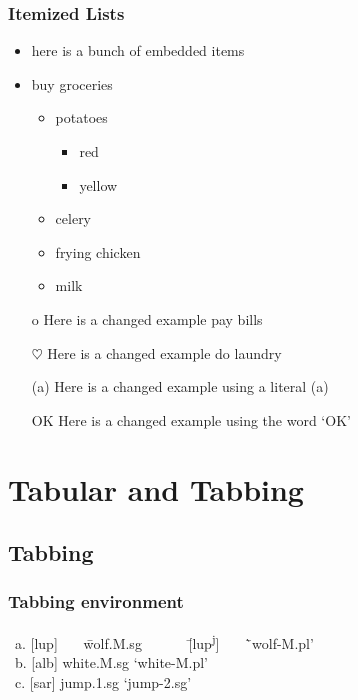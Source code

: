 \documentclass[noamsthm]{beamer}
\begin{document}
\begin{frame}
\frametitle{Itemized Lists}


\begin{itemize}
	\item here is a bunch of embedded items
	\item buy groceries
	\begin{itemize}
		\item potatoes
		\begin{itemize}
			\item red
			\item yellow
		\end{itemize}
		\item celery
		\item frying chicken
		\item milk
	\end{itemize}
	\item[o] Here is a changed example pay bills
	\item [$\heartsuit$] Here is a changed example do laundry
	\item [(a)] Here is a changed example using a literal (a)
	\item [OK] Here is a changed example using the word `OK'

\end{itemize}

\end{frame}

\section{Tabular and Tabbing}

\subsection{Tabbing}

\begin{frame}
\frametitle{Tabbing environment}

\begin{example}
\begin{tabbing}
~a. 	[lup] ~~~\=	wolf.M.sg  ~~~~~~\= [lup\textsuperscript{j}]  ~~~\= 	`wolf-M.pl'\\%
~b. 	[alb] 	\> white.M.sg  \> `white-M.pl' \\%
~c. 	[sar]	\> jump.1.sg 	 \> `jump-2.sg'\\ %
\end{tabbing}
\end{example}

\end{frame}
\end{document}
